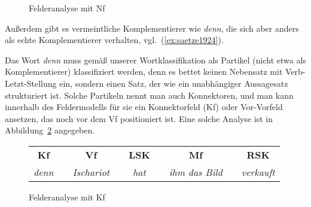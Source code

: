 
\begin{figure}[!h]
  \centering
  \caption{Felderanalyse mit Nf}
  \label{fig:nachfeld}
\end{figure}

Außerdem gibt es vermeintliche Komplementierer wie \textit{denn}, die sich aber anders als echte Komplementierer verhalten, vgl.\ (\ref{ex:saetze1924}).

\begin{exe}
  \ex\label{ex:saetze1924}
  \begin{xlist}
  \end{xlist}
\end{exe}


Das Wort \textit{denn} muss gemäß unserer Wortklassifikation als Partikel (nicht etwa als Komplementierer) klassifiziert werden, denn es bettet keinen Nebensatz mit Verb-Letzt-Stellung ein, sondern einen Satz, der wie ein unabhängiger Aussagesatz strukturiert ist.
Solche Partikeln nennt man auch Konnektoren, und man kann innerhalb des Feldermodells für sie ein Konnektorfeld (Kf) oder Vor-Vorfeld ansetzen, das noch vor dem Vf positioniert ist.
Eine solche Analyse ist in Abbildung~\ref{fig:konnektorfeld} angegeben.

\begin{figure}[!h]
  \centering
  \begin{tabular}{cp{0.1em}cp{0.1em}cp{0.1em}cp{0.1em}c}
    \textbf{Kf} && \textbf{Vf} && \textbf{LSK} && \textbf{Mf} && \textbf{RSK} \\
    \cmidrule{1-1}\cmidrule{3-3}\cmidrule{5-5}\cmidrule{7-7}\cmidrule{9-9}
    \textit{denn} && \textit{Ischariot} && \textit{hat} && \textit{ihm das Bild} && \textit{verkauft} \\
  \end{tabular}
  \caption{Felderanalyse mit Kf}
  \label{fig:konnektorfeld}
\end{figure}


